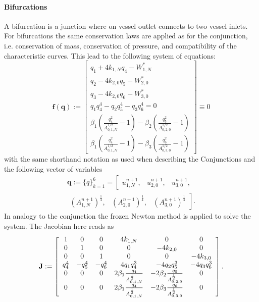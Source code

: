 \documentclass[a4paper, oneside]{discothesis}
\begin{document}
					\paragraph{Bifurcations} \label{par:bifurcations}
					A bifurcation is a junction where on vessel outlet connects to two vessel inlets.
					For bifurcations the same conservation laws are applied as for the conjunction, i.e. conservation of mass, conservation of pressure, and compatibility of the characteristic curves.
					This lead to the following system of equations:
					\begin{equation}
						\mathbf{f}(\mathbf{q}):=\left[\begin{array}{c}
								q_{1}+4 k_{1,N} q_{4}-W_{1,N}^* \\
								q_{2}-4 k_{2,0} q_{5}-W_{2,0}^* \\
								q_{3}-4 k_{2,0} q_{6}-W_{3,0}^* \\
								q_{1} q_{4}^4-q_{2} q_{5}^4-q_{3} q_{6}^4=0 \\
								\beta_1\left(\frac{q_{4}^2}{A_{0,1,N}^{1 / 2}}-1\right)-\beta_2\left(\frac{q_{5}^2}{A_{0,2,0}^{1 / 2}}-1\right) \\
								\beta_1\left(\frac{q_{4}^2}{A_{0,1,N}^{1 / 2}}-1\right)-\beta_3\left(\frac{q_{6}^2}{A_{0,3,0}^{1 / 2}}-1\right) 
						\end{array}\right] \equiv 0 \label{syseq_bif}
					\end{equation}
					with the same shorthand notation as used when describing the Conjunctions and the following vector of variables
					\begin{multline}
						\mathbf{q}:=\{q\}_{k=1}^6 = \left[
							\begin{array}{lll}
								u_{1,N}^{n+1}, & u_{2,0}^{n+1}, & u_{3,0}^{n+1},
						\end{array} \right. \\
						\left. \begin{array} {lll}    \left(A_{1,N}^{n+1}\right)^{\frac{1}{4}}, & \left(A_{2,0}^{n+1}\right)^{\frac{1}{4}}, & \left(A_{3,0}^{n+1}\right)^{\frac{1}{4}}
						\end{array}\right].
							\end{multline}
							In analogy to the conjunction the frozen Newton method is applied to solve the system.
							The Jacobian here reads as
							\begin{equation}
								\mathbf{J}:=\left[\begin{array}{c c c c c c}
										1&0&0&4k_{1,N}&0&0\\
										0&1&0&0&-4k_{2,0}&0\\
										0&0&1&0&0&-4k_{3,0}\\
										q_{4}^4 & -q_{5}^4 & -q_{6}^4 & 4q_{1}q_{4}^3 & -4q_{2}q_{5}^3 & -4q_{3}q_{6}^3 \\
										0 & 0 & 0 & 2\beta_1\frac{q_{4}}{A_{0,1,N}^{\frac{1}{2}}} & -2\beta_2\frac{q_{5}}{A_{0,2,0}^{\frac{1}{2}}} & 0\\
										0 & 0 & 0 & 2\beta_1\frac{q_{4}}{A_{0,1,N}^{\frac{1}{2}}} & -2\beta_3\frac{q_{6}}{A_{0,3,0}^{\frac{1}{2}}} & 0\\
									\end{array} 
								\right].
							\end{equation}
\end{document}
